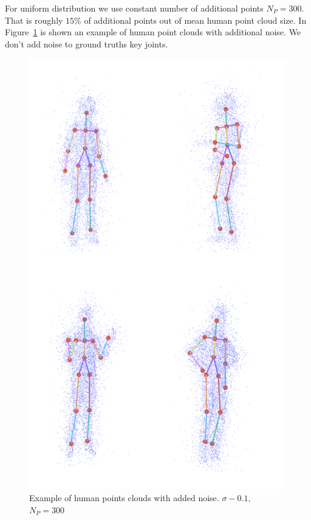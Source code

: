 For uniform distribution we use constant number of additional points $N_P = 300$. That is roughly $15\%$ of additional points out of mean human point cloud size.
In Figure~\ref{img:human-with-noisy-data} is shown an example of human point clouds with additional noise. We don't add noise to ground truths key joints.

\begin{figure}[htbp]
    \centerline{\includegraphics[scale=0.18]{Figures/human-with-noise.png}}
    \caption{Example of human points clouds with added noise. $\sigma - 0.1$, $N_P = 300$}
    \label{img:human-with-noisy-data}
\end{figure}

